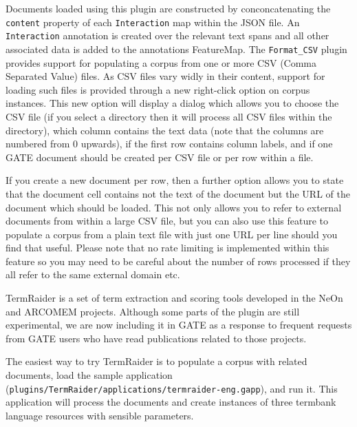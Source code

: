 Documents loaded using this plugin are constructed by conconcatenating the
\verb!content! property of each \verb!Interaction! map within the JSON file.
An \verb!Interaction! annotation is created over the relevant text spans and
all other associated data is added to the annotations FeatureMap.
%
%
The \verb!Format_CSV! plugin provides support for populating a corpus from one
or more CSV (Comma Separated Value) files. As CSV files vary widly in their
content, support for loading such files is provided through a new right-click
option on corpus instances. This new option will display a dialog which allows
you to choose the CSV file (if you select a directory then it will process all
CSV files within the directory), which column contains the text data (note that
the columns are numbered from 0 upwards), if the first row contains column labels,
and if one GATE document should be created per CSV file or per row within a file.

If you create a new document per row, then a further option allows you to state
that the document cell contains not the text of the document but the URL of the
document which should be loaded. This not only allows you to refer to external
documents from within a large CSV file, but you can also use this feature to
populate a corpus from a plain text file with just one URL per line should
you find that useful. Please note that no rate limiting is implemented within
this feature so you may need to be careful about the number of rows processed
if they all refer to the same external domain etc.

TermRaider is a set of term extraction and scoring tools developed in the NeOn
and ARCOMEM projects.  Although some parts of the plugin are still experimental,
we are now including it in GATE as a response to frequent requests from GATE
users who have read publications related to those projects.

The easiest way to try TermRaider is to populate a corpus with related
documents, load the sample application
(\texttt{plugins/TermRaider/applications/termraider-eng.gapp}), and run it.
This application will process the documents and create instances of three
termbank language resources with sensible parameters.

